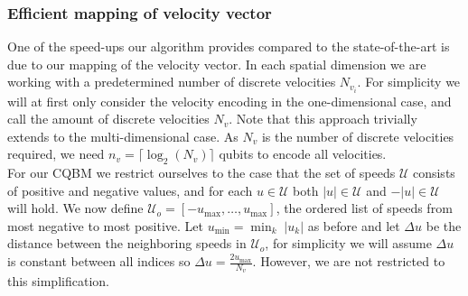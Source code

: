 \subsubsection{Efficient mapping of velocity vector}
One of the speed-ups our algorithm provides compared to the state-of-the-art is due to our mapping of the velocity vector. 
In each spatial dimension we are working with a predetermined number of discrete velocities $N_{v_i}$. 
For simplicity we will at first only consider the velocity encoding in the one-dimensional case, and call the amount of discrete velocities $N_{v}$. Note that this approach trivially extends to the multi-dimensional case.
As $N_v$ is the number of discrete velocities required, we need $n_{v} = \lceil\log_2\left(N_v\right)\rceil$ qubits to encode all velocities. \\
For our CQBM we restrict ourselves to the case that the set of speeds $\mathcal{U}$ consists of positive and negative values, and for each $u\in \mathcal{U}$ both $|u|\in \mathcal{U}$ and $-|u|\in \mathcal{U}$ will hold. We now define $\mathcal{U}_o = [-u_{\max}, \dots , u_{\max} ]$, the ordered list of speeds from most negative to most positive. 
Let $u_{\min} = \min_k \; |u_k| $ as before and let $\Delta u $ be the distance between the neighboring speeds in $\mathcal{U}_o$, for simplicity we will assume $\Delta u$ is constant between all indices so $\Delta u=\frac{2u_{\max}}{N_v}$. However, we are not restricted to this simplification.  \\

